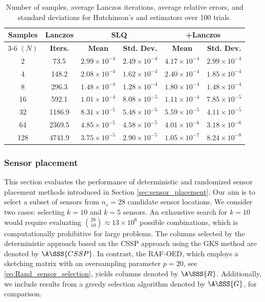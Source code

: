 \documentclass{aims} %
\theoremstyle{definition}
\begin{document}
%
\begin{table}[ht!]
\centering
\begin{tabular}{cc|cc|cc}
\hline
\textbf{Samples} & \textbf{Lanczos}  & \multicolumn{2}{c}{\textbf{SLQ}} & \multicolumn{2}{c}{\textbf{\xntrace{}+Lanczos} } \\
\cline{3-6}
   $(N)$     &      \textbf{Iters.}         & \textbf{Mean} & \textbf{Std. Dev.} & \textbf{Mean} & \textbf{Std. Dev.} \\
\hline
2       & 73.5                & $2.99 \times 10^{-4}$ & $2.49 \times 10^{-4}$ & $4.17 \times 10^{-4}$ & $2.99 \times 10^{-4}$ \\
4       & 148.2               & $2.08 \times 10^{-4}$ & $1.62 \times 10^{-4}$ & $2.40 \times 10^{-4}$ & $1.85 \times 10^{-4}$ \\
8       & 296.3               & $1.48 \times 10^{-4}$ & $1.28 \times 10^{-4}$ & $1.80 \times 10^{-4}$ & $1.48 \times 10^{-4}$ \\
16      & 592.1               & $1.01 \times 10^{-4}$ & $8.08 \times 10^{-5}$ & $1.11 \times 10^{-4}$ & $7.85 \times 10^{-5}$ \\
32      & 1186.9              & $8.31 \times 10^{-5}$ & $5.48 \times 10^{-5}$ & $5.59 \times 10^{-5}$ & $4.11 \times 10^{-5}$ \\
64      & 2369.5              & $4.85 \times 10^{-5}$ & $4.58 \times 10^{-5}$ & $4.01 \times 10^{-6}$ & $3.18 \times 10^{-6}$ \\
128     & 4741.9              & $3.75 \times 10^{-5}$ & $2.90 \times 10^{-5}$ & $1.05 \times 10^{-7}$ & $8.24 \times 10^{-8}$ \\
\hline
\end{tabular}
\caption{Number of samples, average Lanczos iterations, average relative errors, and standard deviations for Hutchinson's  and \xntrace{}  estimators over 100 trials.}
\label{tab:SLQ_summary}
\end{table}

%
\subsubsection*{Sensor placement} 
%
This section evaluates the performance of deterministic and randomized sensor placement methods introduced in Section \ref{sec:sensor_placement}. 
Our aim is to select a subset of sensors from  $n_s=28$ candidate sensor locations. We consider two cases: selecting $k=10$ and $k=5$ sensors. 
%
An exhaustive search for  $k=10$  would require evaluating   ${28 \choose 10} \approx 13 \times 10^6$ possible combinations, which is computationally prohibitive for large problems.
%
The columns selected by the deterministic approach based on the CSSP approach using the GKS method are denoted by $\A\SSS{CSSP}$. In contrast, the RAF-OED, which employs a sketching matrix with an oversampling parameter $p=20$, see \eqref{eq:Rand_sensor_selection}, yields columns denoted by $\A\SSS{R}$. 
Additionally, we include results from a  greedy selection algorithm denoted by $\A\SSS{G}$, for comparison. 
\end{document}
